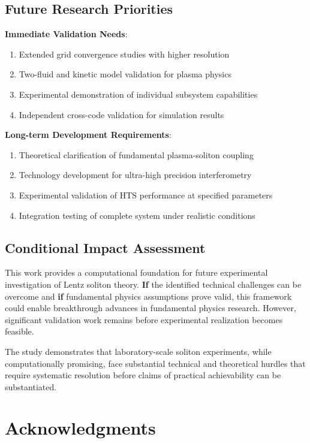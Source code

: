 \documentclass[12pt,a4paper]{article}
\begin{document}
\subsection{Future Research Priorities}
\textbf{Immediate Validation Needs}:
\begin{enumerate}
\item Extended grid convergence studies with higher resolution
\item Two-fluid and kinetic model validation for plasma physics
\item Experimental demonstration of individual subsystem capabilities
\item Independent cross-code validation for simulation results
\end{enumerate}

\textbf{Long-term Development Requirements}:
\begin{enumerate}
\item Theoretical clarification of fundamental plasma-soliton coupling
\item Technology development for ultra-high precision interferometry
\item Experimental validation of HTS performance at specified parameters
\item Integration testing of complete system under realistic conditions
\end{enumerate}

\subsection{Conditional Impact Assessment}
This work provides a computational foundation for future experimental investigation of Lentz soliton theory. \textbf{If} the identified technical challenges can be overcome and \textbf{if} fundamental physics assumptions prove valid, this framework could enable breakthrough advances in fundamental physics research. However, significant validation work remains before experimental realization becomes feasible.

The study demonstrates that laboratory-scale soliton experiments, while computationally promising, face substantial technical and theoretical hurdles that require systematic resolution before claims of practical achievability can be substantiated.

\section*{Acknowledgments}
\end{document}

